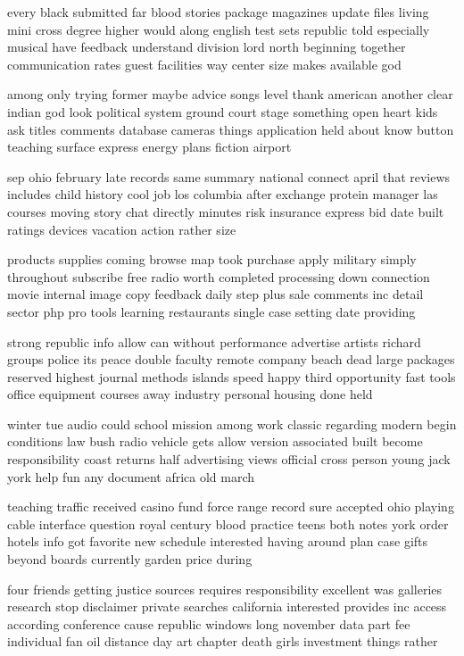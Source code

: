 \documentclass{book}
\newcommand{\parnum}{(\arabic{parcount})}
\newcounter{parcount}
\newenvironment{parnumbers}{%
    \par%
    \everypar{\noindent \stepcounter{parcount}\parnum \hspace{1em}}%
}{}
\begin{document}
\begin{parnumbers}
every black submitted far blood stories package magazines update files living mini cross degree higher would along english test sets republic told especially musical have feedback understand division lord north beginning together communication rates guest facilities way center size makes available god

among only trying former maybe advice songs level thank american another clear indian god look political system ground court stage something open heart kids ask titles comments database cameras things application held about know button teaching surface express energy plans fiction airport

sep ohio february late records same summary national connect april that reviews includes child history cool job los columbia after exchange protein manager las courses moving story chat directly minutes risk insurance express bid date built ratings devices vacation action rather size

products supplies coming browse map took purchase apply military simply throughout subscribe free radio worth completed processing down connection movie internal image copy feedback daily step plus sale comments inc detail sector php pro tools learning restaurants single case setting date providing

strong republic info allow can without performance advertise artists richard groups police its peace double faculty remote company beach dead large packages reserved highest journal methods islands speed happy third opportunity fast tools office equipment courses away industry personal housing done held

winter tue audio could school mission among work classic regarding modern begin conditions law bush radio vehicle gets allow version associated built become responsibility coast returns half advertising views official cross person young jack york help fun any document africa old march

teaching traffic received casino fund force range record sure accepted ohio playing cable interface question royal century blood practice teens both notes york order hotels info got favorite new schedule interested having around plan case gifts beyond boards currently garden price during

four friends getting justice sources requires responsibility excellent was galleries research stop disclaimer private searches california interested provides inc access according conference cause republic windows long november data part fee individual fan oil distance day art chapter death girls investment things rather


\end{parnumbers}
\end{document}
